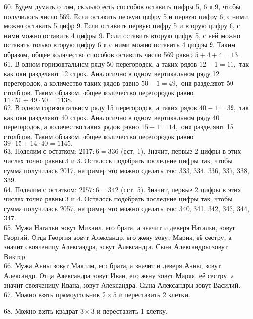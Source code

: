 60. Будем думать о том, сколько есть способов оставить цифры 5, 6 и 9, чтобы получилось число 569. Если оставить первую цифру 5 и первую цифру 6, с ними можно оставить 5 цифр 9. Если оставить первую цифру 5 и вторую цифру 6, с ними можно оставить 4 цифры 9. Если оставить вторую цифру 5, с ней можно оставить только вторую цифру 6 и с ними можно оставить 4 цифры 9. Таким образом, общее количество способов оставить число 569 равно $5+4+4=13.$\\
61. В одном горизонтальном ряду 50 перегородок, а таких рядов $12-1=11,$ так как они разделяют 12 строк. Аналогично в одном вертикальном ряду 12 перегородок, а количество таких рядов равно $50-1=49,$ они разделяют 50 столбцов. Таким образом, общее количество перегородок равно $11\cdot50+49\cdot50=1138.$\\
62. В одном горизонтальном ряду 15 перегородок, а таких рядов $40-1=39,$ так как они разделяют 40 строк. Аналогично в одном вертикальном ряду 40 перегородок, а количество таких рядов равно $15-1=14,$ они разделяют 15 столбцов. Таким образом, общее количество перегородок равно $39\cdot15+14\cdot40=1145.$\\
63. Поделим с остатком: $2017:6=336$ (ост. 1). Значит, первые 2 цифры в этих числах точно равны 3 и 3. Осталось подобрать последние цифры так, чтобы сумма получилась 2017, например это можно сделать так: 333, 334, 336, 337, 338, 339.\\
64. Поделим с остатком: $2057:6=342$ (ост. 5). Значит, первые 2 цифры в этих числах точно равны 3 и 4. Осталось подобрать последние цифры так, чтобы сумма получилась 2057, например это можно сделать так: 340, 341, 342, 343, 344, 347.\\
65. Мужа Натальи зовут Михаил, его брата, а значит и деверя Натальи, зовут Георгий. Отца Георгия зовут Александр, его жену зовут Мария, её сестру, а значит свояченицу Александра, зовут Александра. Сына Александры зовут Виктор.\\
66. Мужа Анны зовут Максим, его брата, а значит и деверя Анны, зовут Александр. Отца Александра зовут Иван, его жену зовут Мария, её сестру, а значит свояченицу Ивана, зовут Александра. Сына Александры зовут Василий.\\
67. Можно взять прямоугольник $2\times5$ и переставить 2 клетки.
\begin{center}
\begin{figure}[ht!]
\end{figure}
\end{center}
68. Можно взять квадрат $3\times3$ и переставить 1 клетку.

